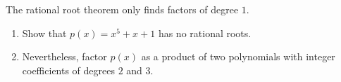 The rational root theorem only finds factors of degree $1$.
\begin{enumerate}
\item[(a)] Show that $p(x)=x^5+x+1$ has no rational roots.
\item[(b)] Nevertheless, factor $p(x)$ as a product of two polynomials with integer coefficients of degrees $2$ and $3$.
\end{enumerate}
